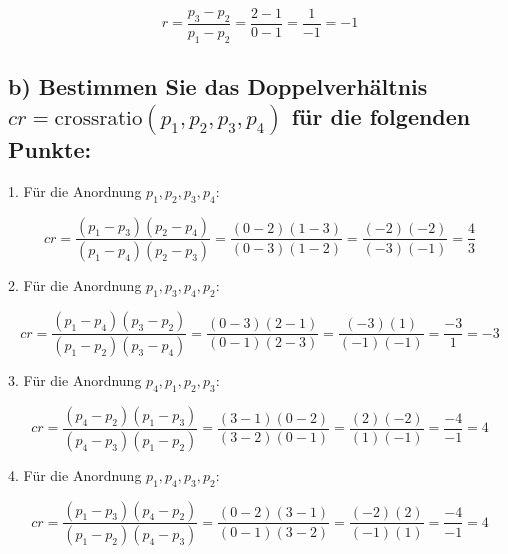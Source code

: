 \documentclass{article}
\begin{document}
\[ r = \frac{p_3 - p_2}{p_1 - p_2} = \frac{2 - 1}{0 - 1} = \frac{1}{-1} = -1 \]

\subsection*{b) Bestimmen Sie das Doppelverhältnis \( cr = \text{crossratio}(p_1, p_2, p_3, p_4) \) für die folgenden Punkte:}

1. Für die Anordnung \( p_1, p_2, p_3, p_4 \):

\[ cr = \frac{(p_1 - p_3)(p_2 - p_4)}{(p_1 - p_4)(p_2 - p_3)} = \frac{(0 - 2)(1 - 3)}{(0 - 3)(1 - 2)} = \frac{(-2)(-2)}{(-3)(-1)} = \frac{4}{3} \]

2. Für die Anordnung \( p_1, p_3, p_4, p_2 \):

\[ cr = \frac{(p_1 - p_4)(p_3 - p_2)}{(p_1 - p_2)(p_3 - p_4)} = \frac{(0 - 3)(2 - 1)}{(0 - 1)(2 - 3)} = \frac{(-3)(1)}{(-1)(-1)} = \frac{-3}{1} = -3 \]

3. Für die Anordnung \( p_4, p_1, p_2, p_3 \):

\[ cr = \frac{(p_4 - p_2)(p_1 - p_3)}{(p_4 - p_3)(p_1 - p_2)} = \frac{(3 - 1)(0 - 2)}{(3 - 2)(0 - 1)} = \frac{(2)(-2)}{(1)(-1)} = \frac{-4}{-1} = 4 \]

4. Für die Anordnung \( p_1, p_4, p_3, p_2 \):

\[ cr = \frac{(p_1 - p_3)(p_4 - p_2)}{(p_1 - p_2)(p_4 - p_3)} = \frac{(0 - 2)(3 - 1)}{(0 - 1)(3 - 2)} = \frac{(-2)(2)}{(-1)(1)} = \frac{-4}{-1} = 4 \]
\end{document}
